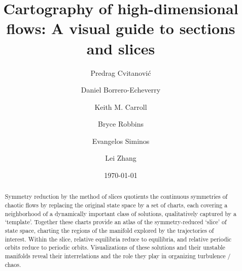 \documentclass[aip,cha,reprint,
secnumarabic,
nofootinbib, tightenlines,
nobibnotes, showkeys, showpacs,
groupedaddress
]{revtex4-1}
\begin{document}
\title[High-dimensional cartography]
{Cartography of high-dimensional flows: A visual guide to sections and slices}


\author{Predrag Cvitanovi{\'c}}
\author{Daniel Borrero-Echeverry}
\author{Keith M. Carroll}
\author{Bryce Robbins}
\author{Evangelos Siminos}
\author{Lei Zhang}

\date{\today}

    \begin{abstract}
Symmetry reduction by the method of slices quotients the continuous
symmetries of chaotic flows by replacing the original state space by a
set of charts, each covering a neighborhood of a dynamically important
class of solutions, qualitatively captured by a `template'. Together
these charts provide an atlas of the symmetry-reduced `slice' of state
space, charting the regions of the manifold explored by the trajectories
of interest. Within the slice, relative equilibria reduce to equilibria,
and relative periodic orbits reduce to periodic orbits. Visualizations of
these solutions and their unstable manifolds reveal their interrelations
and the role they play in organizing turbulence / chaos.
    \end{abstract}


\maketitle
\end{document}

